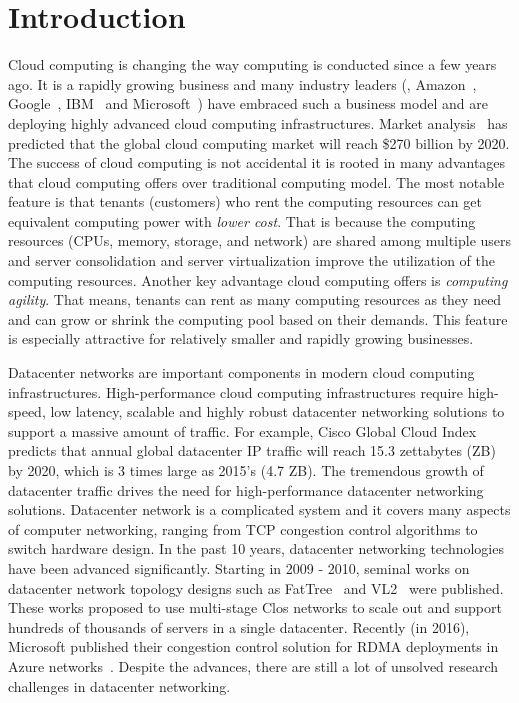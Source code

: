 \chapter{Introduction}
\label{thesis:chapter:intro}

Cloud computing is changing the way computing is conducted since a few years ago.
It is a rapidly growing business and many industry leaders
(\eg{}, Amazon~\cite{amazon-aws}, Google~\cite{google-compute}, 
IBM~\cite{ibm-softlayer,ibm-bluemix} and
Microsoft~\cite{microsoft-azure}) have embraced such a
business model and are deploying highly advanced cloud computing infrastructures.
Market analysis~\cite{cloud-market2020}
has predicted that the global cloud computing market will
reach \$270 billion by 2020. The success of cloud computing is
not accidental \textemdash\xspace it is rooted in many advantages that cloud computing offers
over traditional computing model. The most notable feature is that tenants
(customers) who rent the computing resources can get equivalent computing power
with \emph{lower cost}. That is because the computing resources
(CPUs, memory, storage, and network) are shared among multiple users and
server consolidation and server virtualization improve the utilization
of the computing resources. Another key advantage cloud computing offers
is \emph{computing agility}. That means, tenants can rent as many computing
resources as they need and can grow or shrink the computing pool based on their demands.
This feature is especially attractive for relatively smaller and
rapidly growing businesses.

Datacenter networks are important components in modern cloud computing infrastructures. 
High-performance cloud computing infrastructures require high-speed, low latency, scalable and 
highly robust datacenter networking solutions to support a massive amount of traffic. 
For example, Cisco Global Cloud Index~\cite{cisco-predict} predicts that annual global datacenter IP traffic will 
reach 15.3 zettabytes (ZB) by 2020, which is 3 times large as 2015's (4.7 ZB). 
The tremendous growth of datacenter traffic drives the need for high-performance 
datacenter networking solutions. Datacenter network is a complicated system and it covers many 
aspects of computer networking, ranging from TCP congestion control algorithms to switch hardware design. 
In the past 10 years, datacenter networking technologies have been advanced significantly. 
Starting in 2009 - 2010, seminal works on datacenter network topology designs such as 
FatTree~\cite{fattree} and VL2~\cite{vl2} were published. These works proposed to use multi-stage Clos networks to 
scale out and support hundreds of thousands of servers in a single datacenter. 
Recently (in 2016), Microsoft published their congestion control solution for 
RDMA deployments in Azure networks~\cite{zhu2015congestion}. 
Despite the advances, there are still a lot of unsolved research challenges in datacenter networking.

